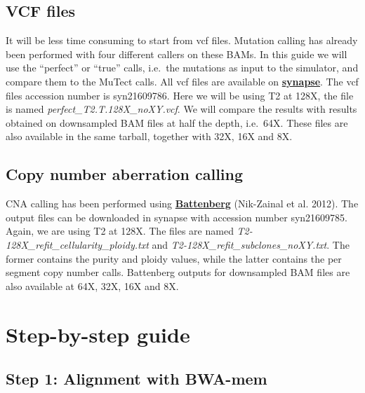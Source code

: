 \documentclass[]{article}
\begin{document}
\hypertarget{vcf-files}{%
\subsection{VCF files}\label{vcf-files}}

It will be less time consuming to start from vcf files. Mutation calling
has already been performed with four different callers on these BAMs. In
this guide we will use the ``perfect'' or ``true'' calls, i.e.~the
mutations as input to the simulator, and compare them to the MuTect
calls. All vcf files are available on
\href{https://www.synapse.org/\#!Synapse:syn2813581/wiki/303137}{\textbf{synapse}}.
The vcf files accession number is syn21609786. Here we will be using T2
at 128X, the file is named \emph{perfect\_T2.T.128X\_noXY.vcf}. We will
compare the results with results obtained on downsampled BAM files at
half the depth, i.e.~64X. These files are also available in the same
tarball, together with 32X, 16X and 8X.

\hypertarget{copy-number-aberration-calling}{%
\subsection{Copy number aberration
calling}\label{copy-number-aberration-calling}}

CNA calling has been performed using
\href{https://github.com/Wedge-Oxford/battenberg}{\textbf{Battenberg}}
(Nik-Zainal et al. 2012). The output files can be downloaded in synapse
with accession number syn21609785. Again, we are using T2 at 128X. The
files are named \emph{T2-128X\_refit\_cellularity\_ploidy.txt} and
\emph{T2-128X\_refit\_subclones\_noXY.txt}. The former contains the
purity and ploidy values, while the latter contains the per segment copy
number calls. Battenberg outputs for downsampled BAM files are also
available at 64X, 32X, 16X and 8X.

\newpage

\hypertarget{step-by-step-guide}{%
\section{Step-by-step guide}\label{step-by-step-guide}}

\hypertarget{step-1-alignment-with-bwa-mem}{%
\subsection{Step 1: Alignment with
BWA-mem}\label{step-1-alignment-with-bwa-mem}}
\end{document}

